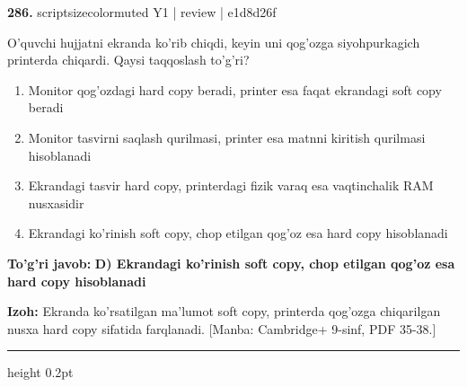 \documentclass[10pt,a4paper]{article}
\begin{document}
{\bfseries\sffamily\color{ink} 286.} {scriptsizecolor{muted} Y1 | review | e1d8d26f}
\par
O'quvchi hujjatni ekranda ko'rib chiqdi, keyin uni qog'ozga siyohpurkagich printerda chiqardi. Qaysi taqqoslash to'g'ri?
\begin{enumerate}[label=\Alph*),leftmargin=9mm]
\item Monitor qog'ozdagi hard copy beradi, printer esa faqat ekrandagi soft copy beradi
\item Monitor tasvirni saqlash qurilmasi, printer esa matnni kiritish qurilmasi hisoblanadi
\item Ekrandagi tasvir hard copy, printerdagi fizik varaq esa vaqtinchalik RAM nusxasidir
\item Ekrandagi ko'rinish soft copy, chop etilgan qog'oz esa hard copy hisoblanadi
\end{enumerate}
\begin{tcolorbox}[enhanced,breakable,colback=teal!4,colframe=teal!60!black,boxrule=0.45pt,arc=1.2mm,left=2.7mm,right=2.7mm,top=1.8mm,bottom=1.8mm,before skip=2mm,after skip=2mm]
{\bfseries\sffamily\color{teal}To'g'ri javob:} \textbf{D) Ekrandagi ko'rinish soft copy, chop etilgan qog'oz esa hard copy hisoblanadi}
\par\smallskip
{\bfseries Izoh:} Ekranda ko'rsatilgan ma'lumot soft copy, printerda qog'ozga chiqarilgan nusxa hard copy sifatida farqlanadi. [Manba: Cambridge+ 9-sinf, PDF 35-38.]
\end{tcolorbox}
\vspace{2mm}\hrule height 0.2pt\vspace{3mm}
\end{document}
